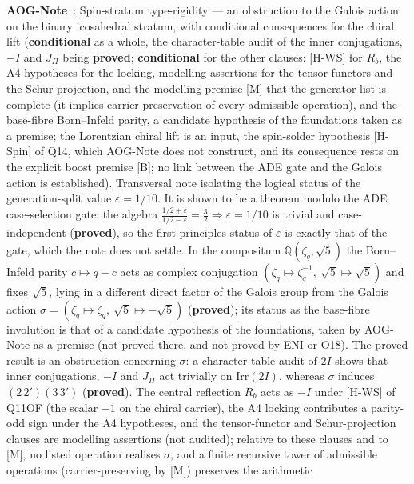 \documentclass[11pt,a4paper]{article}
\newcommand{\sproved}{\textcolor{cproved}{\textbf{proved}}}
\newcommand{\scond}{\textcolor{ccond}{\textbf{conditional}}}
\begin{document}
    \textbf{AOG-Note}~\cite{Beau2026aog}: Spin-stratum type-rigidity --- an obstruction to the Galois action on the
    binary icosahedral stratum, with conditional consequences for the chiral lift (\scond{} as a whole, the
    character-table audit of the inner conjugations, $-I$ and $J_\Pi$ being \sproved; \scond{} for the other clauses: [H-WS] for $R_b$, the A4
    hypotheses for the locking, modelling assertions for the tensor functors and the Schur projection, and the modelling
    premise [M] that the generator list is complete (it implies carrier-preservation of every admissible operation), and
    the base-fibre Born--Infeld parity, a candidate hypothesis of the foundations taken as a premise; the Lorentzian
    chiral lift is an input, the spin-solder hypothesis
    [H-Spin] of Q14, which AOG-Note does not construct, and its consequence rests on the explicit boost premise [B]; no link between the ADE gate and the Galois action is
    established).
    Transversal note isolating the logical status of the generation-split value
    $\varepsilon = 1/10$. It is shown to be a theorem modulo the ADE case-selection gate: the algebra
    $\tfrac{1/2+\varepsilon}{1/2-\varepsilon} = \tfrac{3}{2} \Rightarrow \varepsilon = 1/10$ is trivial and
    case-independent (\sproved), so the first-principles status of $\varepsilon$ is exactly that of the gate, which the
    note does not settle.
    In the compositum $\mathbb{Q}(\zeta_q,\sqrt{5})$ the Born--Infeld parity $c \mapsto q-c$ acts as complex conjugation
    $(\zeta_q \mapsto \zeta_q^{-1},\ \sqrt{5} \mapsto \sqrt{5})$ and fixes $\sqrt{5}$, lying in a different direct
    factor of the Galois group from the Galois action
    $\sigma = (\zeta_q \mapsto \zeta_q,\ \sqrt{5} \mapsto -\sqrt{5})$ (\sproved); its status as the base-fibre
    involution is that of a candidate hypothesis of the foundations, taken by AOG-Note as a premise (not proved there,
    and not proved by ENI or O18).
    The proved result is an obstruction concerning $\sigma$: a character-table audit of $2I$ shows that inner
    conjugations, $-I$ and $J_\Pi$ act trivially on $\mathrm{Irr}(2I)$, whereas $\sigma$ induces
    $(2\,2')(3\,3')$ (\sproved).
    The central reflection $R_b$ acts as $-I$ under [H-WS] of Q11OF (the scalar $-1$ on the chiral carrier), the A4
    locking contributes a parity-odd sign under the A4 hypotheses, and the tensor-functor and Schur-projection clauses
    are modelling assertions (not audited); relative to these clauses and to [M], no listed operation realises
    $\sigma$, and a finite recursive tower of admissible operations (carrier-preserving by [M]) preserves the arithmetic
\end{document}

